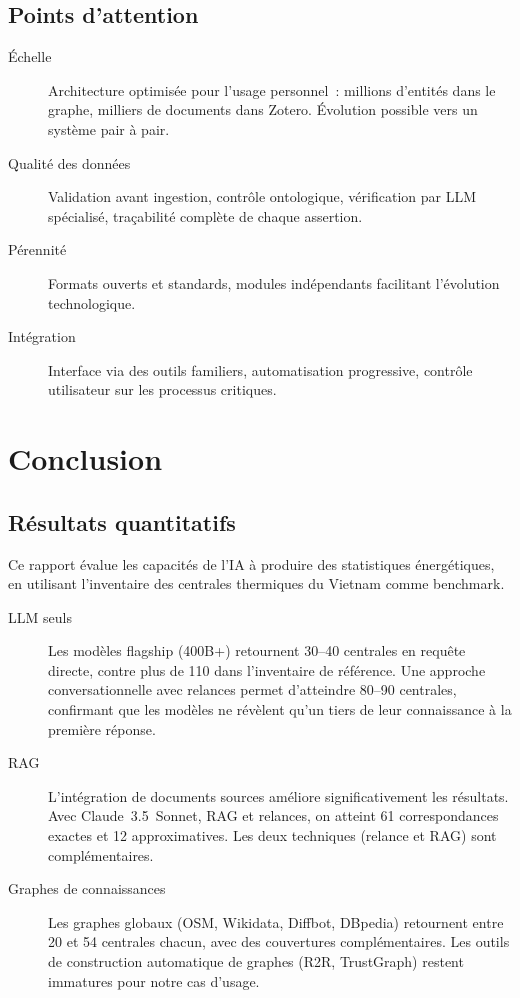 \documentclass[a4paper,11pt]{report}
\begin{document}
\section{Points d'attention}

\begin{description}
\item[Échelle] Architecture optimisée pour l'usage personnel~: millions d'entités dans le graphe, milliers de documents dans Zotero. Évolution possible vers un système pair à pair.
\item[Qualité des données] Validation avant ingestion, contrôle ontologique, vérification par LLM spécialisé, traçabilité complète de chaque assertion.
\item[Pérennité] Formats ouverts et standards, modules indépendants facilitant l'évolution technologique.
\item[Intégration] Interface via des outils familiers, automatisation progressive, contrôle utilisateur sur les processus critiques.
\end{description}

\chapter{Conclusion}\label{chap:conclusion}

\section{Résultats quantitatifs}

Ce rapport évalue les capacités de l'IA à produire des statistiques énergétiques, en utilisant l'inventaire des centrales thermiques du Vietnam comme benchmark.

\begin{description}
\item[LLM seuls] Les modèles flagship (400B+) retournent 30--40 centrales en requête directe, contre plus de 110 dans l'inventaire de référence. Une approche conversationnelle avec relances permet d'atteindre 80--90 centrales, confirmant que les modèles ne révèlent qu'un tiers de leur connaissance à la première réponse.
\item[RAG] L'intégration de documents sources améliore significativement les résultats. Avec Claude~3.5~Sonnet, RAG et relances, on atteint 61 correspondances exactes et 12 approximatives. Les deux techniques (relance et RAG) sont complémentaires.
\item[Graphes de connaissances] Les graphes globaux (OSM, Wikidata, Diffbot, DBpedia) retournent entre 20 et 54 centrales chacun, avec des couvertures complémentaires. Les outils de construction automatique de graphes (R2R, TrustGraph) restent immatures pour notre cas d'usage.
\end{description}
\end{document}
